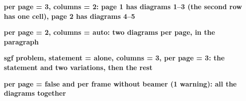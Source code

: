 \documentclass{article}
\newcommand\case[1]{\par\medskip\noindent\textbf{#1}\par\nopagebreak}
\begin{document}

\case{per page = 3, columns = 2: page 1 has diagrams 1--3 (the second row has one cell), page 2 has diagrams 4--5}

\newpage
\case{per page = 2, columns = auto: two diagrams per page, in the paragraph}

\newpage
\case{sgf problem, statement = alone, columns = 3, per page = 3: the statement and two variations, then the rest}

\newpage
\case{per page = false and per frame without beamer (1 warning): all the diagrams together}
\end{document}
